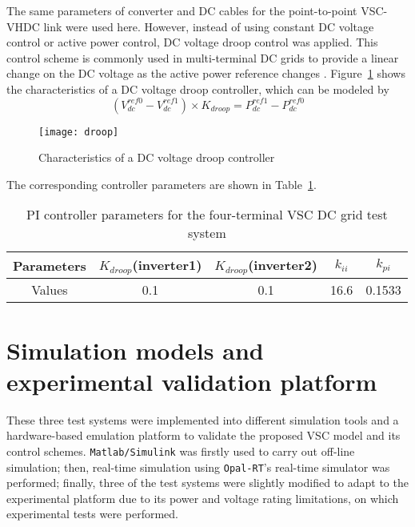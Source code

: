 \documentclass[conference]{IEEEtran}
\begin{document}
The same parameters of converter and DC cables for the point-to-point VSC-VHDC link were used here. However, instead of using constant DC voltage control or active power control, DC voltage droop control was applied. This control scheme is commonly used in multi-terminal DC grids to provide a linear change on the DC voltage as the active power reference changes \cite{Rokib}. Figure~\ref{droop} shows the characteristics of a DC voltage droop controller, which can be modeled by 
\begin{equation}
(V_{dc}^{ref0}-V_{dc}^{ref1})\times K_{droop}=P_{dc}^{ref1}-P_{dc}^{ref0}
\end{equation}
\begin{figure}
\centering
\texttt{[image: droop]}
\caption{Characteristics of a DC voltage droop controller}
\label{droop}
\end{figure}
The corresponding controller parameters are shown in Table~\ref{4terminalsPI}.
\begin{table}[!ht]
\centering
\caption{PI controller parameters for the four-terminal VSC DC grid test system}
\begin{tabular}{| c | c | c | c | c | }
\hline
Parameters & $K_{droop}$(inverter1) & $K_{droop}$(inverter2) & $k_{ii}$ & $k_{pi}$ \\\hline
Values & 0.1 & 0.1 & 16.6 & 0.1533\\\hline
\end{tabular}
\label{4terminalsPI}
\end{table}
\section{Simulation models and experimental validation platform}
These three test systems were implemented into different simulation tools and a hardware-based emulation platform to validate the proposed VSC model and its control schemes. \texttt{Matlab/Simulink} was firstly used to carry out off-line simulation; then, real-time simulation using \texttt{Opal-RT}'s real-time simulator was performed; finally, three of the test systems were slightly modified to adapt to the experimental platform due to its power and voltage rating limitations, on which experimental tests were performed. 
\end{document}
